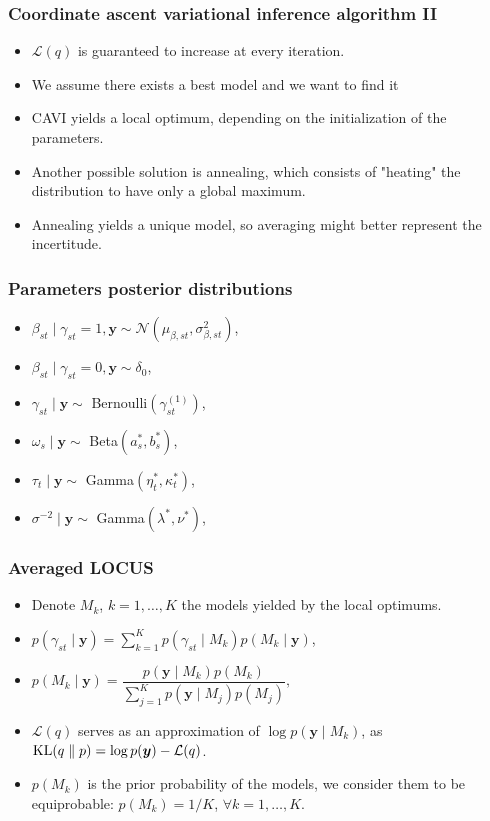 \documentclass{beamer}
\DeclareMathOperator*{\KL}{{\rm KL}}
\begin{document}
\begin{frame}
\frametitle{Coordinate ascent variational inference algorithm II}
\begin{itemize}
\item $\mathcal{L}(q)$ is guaranteed to increase at every iteration.
\item We assume there exists a best model and we want to find it
\item CAVI yields a local optimum, depending on the initialization of the parameters.
\item Another possible solution is annealing, which consists of "heating" the distribution to have only a global maximum.
\item Annealing yields a unique model, so averaging might better represent the incertitude.
\end{itemize}
\end{frame}

\begin{frame}
\frametitle{Parameters posterior distributions}
\begin{itemize}
\item $\beta_{st} \mid \gamma_{st} = 1, \boldsymbol{y} \sim \mathcal{N}\left(\mu_{\beta,st},\sigma_{\beta,st}^2\right)$,
\item $\beta_{st} \mid \gamma_{st} = 0, \boldsymbol{y} \sim \delta_0$,
\item $\gamma_{st} \mid \boldsymbol{y} \sim $ Bernoulli$(\gamma_{st}^{(1)})$,
\item $\omega_s \mid \boldsymbol{y} \sim $ Beta$(a^*_s, b^*_s)$,
\item $\tau_t \mid \boldsymbol{y} \sim $ Gamma$(\eta_t^*, \kappa_t^*)$,
\item $\sigma^{-2} \mid \boldsymbol{y} \sim $ Gamma$(\lambda^*,\nu^*)$,
\end{itemize}
\end{frame}

\begin{frame}
\frametitle{Averaged LOCUS}
\begin{itemize}
\item Denote $M_k$, $k= 1,\ldots, K$ the models yielded by the local optimums.
\item $p(\gamma_{st} \mid \boldsymbol{y}) = \sum_{k=1}^{K}p(\gamma_{st}\mid M_k)p(M_k \mid \boldsymbol{y})$,
\item $p(M_k \mid \boldsymbol{y}) = \dfrac{p(\boldsymbol{y} \mid M_k)p(M_k)}{\sum_{j=1}^{K}p(\boldsymbol{y}\mid M_j)p(M_j)},$
\item $\mathcal{L}(q)$ serves as an approximation of $\log p(\boldsymbol{y} \mid M_k)$, as $\KL(q\parallel p) = \log p(\boldsymbol{y}) - \mathcal{L}(q)$.
\item $p(M_k)$ is the prior probability of the models, we consider them to be equiprobable: $p(M_k) = 1/K$, $\forall k = 1,\ldots,K$.
\end{itemize}
\end{frame}
\end{document}
